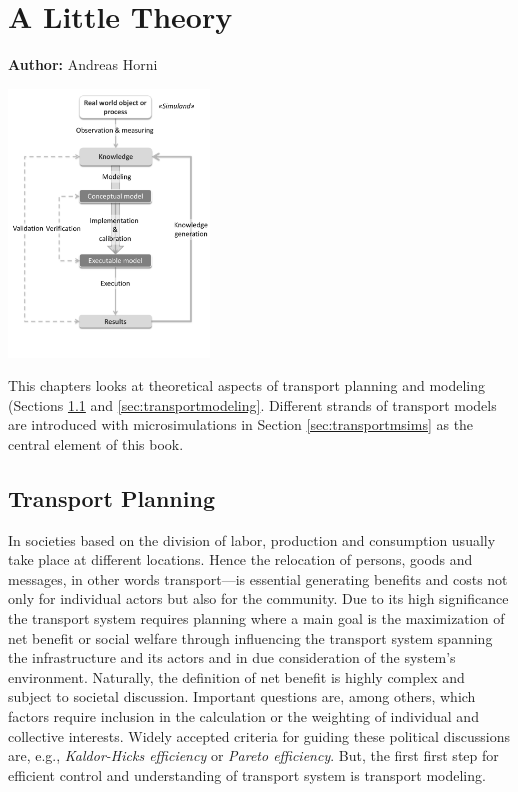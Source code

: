 \chapter{A Little Theory}
\label{ch:alittletheory}
\hfill \textbf{Author:} Andreas Horni 

\begin{center} \includegraphics[width=0.4\textwidth, angle=0]{figures/modeling.pdf} \end{center}

This chapters looks at theoretical aspects of transport planning and modeling (Sections \ref{sec:planning} and \ref{sec:transportmodeling}. Different strands of transport models are introduced with microsimulations in Section \ref{sec:transportmsims} as the central element of this book. 

\section{Transport Planning}
\label{sec:planning}
In societies based on the division of labor, production and consumption usually take place at different locations. Hence the relocation of persons, goods and messages, in other words transport---is essential generating benefits and costs not only for individual actors but also for the community. Due to its high significance the transport system requires planning where a main goal is the maximization of net benefit or social welfare through influencing the transport system spanning the infrastructure and its actors and in due consideration of the system's environment. Naturally, the definition of net benefit is highly complex and subject to societal discussion. Important questions are, among others, which factors require inclusion in the calculation or the weighting of individual and collective interests. Widely accepted criteria for guiding these political discussions are, e.g., \emph{Kaldor-Hicks efficiency} or \emph{Pareto efficiency}. But, the first first step for efficient control and understanding of transport system is transport modeling. 

